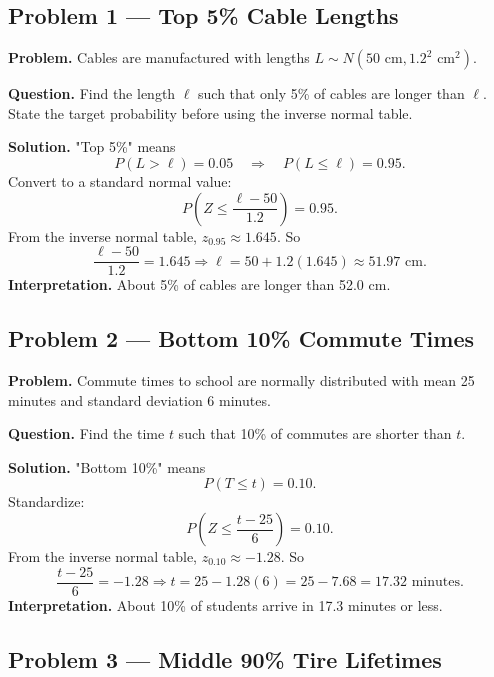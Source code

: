 	\begin{ExamProblems}
		
		\hypertarget{c7-ex1}{}
		\item
		\subsection*{Problem 1 — Top 5\% Cable Lengths}
		
		\textbf{Problem.}
		Cables are manufactured with lengths \(L\sim N(50\text{ cm}, 1.2^2\text{ cm}^2)\).
		
		\textbf{Question.} Find the length \(\ell\) such that only 5\% of cables are longer than \(\ell\).
		State the target probability before using the inverse normal table.
		
		\textbf{Solution.}
		"Top 5\%" means
		\[
		P(L>\ell)=0.05\quad\Rightarrow\quad P(L\le \ell)=0.95.
		\]
		Convert to a standard normal value:
		\[
		P\left(Z\le \frac{\ell-50}{1.2}\right)=0.95.
		\]
		From the inverse normal table, \(z_{0.95}\approx 1.645\).
		So
		\[
		\frac{\ell-50}{1.2}=1.645\Rightarrow \ell=50+1.2(1.645)\approx 51.97\text{ cm}.
		\]
		\textbf{Interpretation.} About 5\% of cables are longer than 52.0 cm.
		
		
		\hypertarget{c7-ex2}{}
		\item
		\subsection*{Problem 2 — Bottom 10\% Commute Times}
		
		\textbf{Problem.}
		Commute times to school are normally distributed with mean 25 minutes and
		standard deviation 6 minutes.
		
		\textbf{Question.} Find the time \(t\) such that 10\% of commutes are shorter than \(t\).
		
		\textbf{Solution.}
		"Bottom 10\%" means
		\[
		P(T\le t)=0.10.
		\]
		Standardize:
		\[
		P\left(Z\le \frac{t-25}{6}\right)=0.10.
		\]
		From the inverse normal table, \(z_{0.10}\approx -1.28\).
		So
		\[
		\frac{t-25}{6}=-1.28\Rightarrow t=25-1.28(6)=25-7.68=17.32\text{ minutes}.
		\]
		\textbf{Interpretation.} About 10\% of students arrive in 17.3 minutes or less.
		
		
		\hypertarget{c7-ex3}{}
		\item
		\subsection*{Problem 3 — Middle 90\% Tire Lifetimes}
		

\end{ExamProblems}
